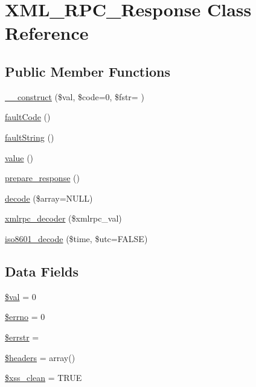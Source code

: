 \hypertarget{class_x_m_l___r_p_c___response}{}\section{X\+M\+L\+\_\+\+R\+P\+C\+\_\+\+Response Class Reference}
\label{class_x_m_l___r_p_c___response}
\subsection*{Public Member Functions}
\begin{DoxyCompactItemize}
\item 
\hyperlink{class_x_m_l___r_p_c___response_a70b762dc61367e2f90588f3c012d3fc2}{\+\_\+\+\_\+construct} (\$val, \$code=0, \$fstr= \textquotesingle{}\textquotesingle{})
\item 
\hyperlink{class_x_m_l___r_p_c___response_ad6849a82f23db4d67e06a7fcaa94aec2}{fault\+Code} ()
\item 
\hyperlink{class_x_m_l___r_p_c___response_a2f922009ed0801616d3df198a48d193b}{fault\+String} ()
\item 
\hyperlink{class_x_m_l___r_p_c___response_aefbfa229f1c9e1fc967bff724a010f9e}{value} ()
\item 
\hyperlink{class_x_m_l___r_p_c___response_ac6925a06291928e6d4e8e53ea10fb1e2}{prepare\+\_\+response} ()
\item 
\hyperlink{class_x_m_l___r_p_c___response_a03c0253c215ae6aaafc6a949276b06bd}{decode} (\$array=N\+U\+L\+L)
\item 
\hyperlink{class_x_m_l___r_p_c___response_a44f453c58a4aad3ccb76dd9926f9fa64}{xmlrpc\+\_\+decoder} (\$xmlrpc\+\_\+val)
\item 
\hyperlink{class_x_m_l___r_p_c___response_afd1f70f703eb82303e1199e8653c9c44}{iso8601\+\_\+decode} (\$time, \$utc=F\+A\+L\+S\+E)
\end{DoxyCompactItemize}
\subsection*{Data Fields}
\begin{DoxyCompactItemize}
\item 
\hyperlink{class_x_m_l___r_p_c___response_aac81a74a7b30767af29bfd9a695636df}{\$val} = 0
\item 
\hyperlink{class_x_m_l___r_p_c___response_a2be10a914e39a6b1f855ddf3b9a21367}{\$errno} = 0
\item 
\hyperlink{class_x_m_l___r_p_c___response_a126a4369646afcf007816bfa8c208d11}{\$errstr} = \textquotesingle{}\textquotesingle{}
\item 
\hyperlink{class_x_m_l___r_p_c___response_a52500036ee807241b8b4b7e2367c49ef}{\$headers} = array()
\item 
\hyperlink{class_x_m_l___r_p_c___response_a0f2ee8861c0b3164a5c6e126dd98c0cc}{\$xss\+\_\+clean} = T\+R\+U\+E
\end{DoxyCompactItemize}


